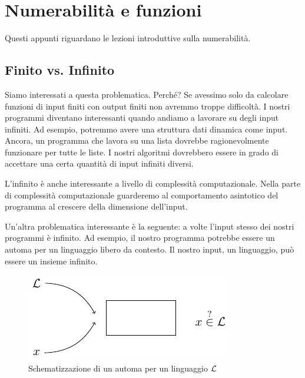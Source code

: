 %
%
%
%
\chapter{Numerabilità e funzioni}

Questi appunti riguardano le lezioni introduttive sulla numerabilità.


\section{Finito vs. Infinito}

Siamo interessati a questa problematica. Perché? Se avessimo solo da calcolare funzioni di input
finiti con output finiti non avremmo troppe difficoltà. I nostri programmi diventano interessanti
quando andiamo a lavorare su degli input infiniti. Ad esempio, potremmo avere una struttura dati
dinamica come input. Ancora, un programma che lavora su una lista dovrebbe ragionevolmente
funzionare per tutte le liste. I nostri algoritmi dovrebbero essere in grado di accettare una
certa quantità di input infiniti diversi.

L'infinito è anche interessante a livello di complessità computazionale. Nella parte di
complessità computazionale guarderemo al comportamento asintotico del programma al crescere della
dimensione dell'input.

Un'altra problematica interessante è la seguente: a volte l'input stesso dei nostri programmi è
infinito.  Ad esempio, il nostro programma potrebbe essere un automa per un linguaggio libero da
contesto. Il nostro input, un linguaggio, può essere un insieme infinito. 

\begin{figure}[h]
    \centering
    \includegraphics{img/LanguageExample.pdf}
    \caption{Schematizzazione di un automa per un linguaggio $\mathcal{L}$}
\end{figure}

